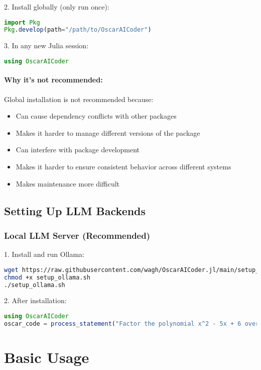 \documentclass[11pt,a4paper]{article}
\begin{document}
2. Install globally (only run once):
\begin{lstlisting}[language=Julia]
import Pkg
Pkg.develop(path="/path/to/OscarAICoder")
\end{lstlisting}

3. In any new Julia session:
\begin{lstlisting}[language=Julia]
using OscarAICoder
\end{lstlisting}

\paragraph{Why it's not recommended:}
Global installation is not recommended because:
\begin{itemize}
    \item Can cause dependency conflicts with other packages
    \item Makes it harder to manage different versions of the package
    \item Can interfere with package development
    \item Makes it harder to ensure consistent behavior across different systems
    \item Makes maintenance more difficult
\end{itemize}

\subsection{Setting Up LLM Backends}

\subsubsection{Local LLM Server (Recommended)}
1. Install and run Ollama: 
\begin{lstlisting}[language=bash]
wget https://raw.githubusercontent.com/wagh/OscarAICoder.jl/main/setup_ollama.sh
chmod +x setup_ollama.sh
./setup_ollama.sh
\end{lstlisting}

2. After installation:
\begin{lstlisting}[language=Julia]
using OscarAICoder
oscar_code = process_statement("Factor the polynomial x^2 - 5x + 6 over the integers.")
\end{lstlisting}

\section{Basic Usage}
\label{sec:basic_usage}
\end{document}
